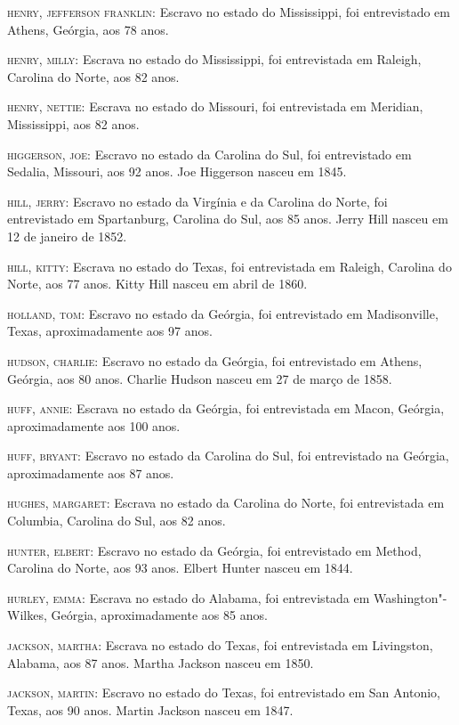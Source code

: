 \begin{Parskip}
\textsc{henry, jefferson franklin:} Escravo no estado do Mississippi,
foi entrevistado em Athens, Geórgia, aos 78 anos.

\textsc{henry, milly:} Escrava no estado do Mississippi, foi
entrevistada em Raleigh, Carolina do Norte, aos 82 anos.

\textsc{henry, nettie:} Escrava no estado do Missouri, foi entrevistada
em Meridian, Mississippi, aos 82 anos.

\textsc{higgerson, joe:} Escravo no estado da Carolina do Sul, foi
entrevistado em Sedalia, Missouri, aos 92 anos. Joe Higgerson nasceu em
1845.

\textsc{hill, jerry:} Escravo no estado da Virgínia e da Carolina do
Norte, foi entrevistado em Spartanburg, Carolina do Sul, aos 85 anos.
Jerry Hill nasceu em 12 de janeiro de 1852.

\textsc{hill, kitty:} Escrava no estado do Texas, foi entrevistada em
Raleigh, Carolina do Norte, aos 77 anos. Kitty Hill nasceu em abril de
1860.

\textsc{holland, tom:} Escravo no estado da Geórgia, foi entrevistado em
Madisonville, Texas, aproximadamente aos 97 anos.

\textsc{hudson, charlie:} Escravo no estado da Geórgia, foi entrevistado
em Athens, Geórgia, aos 80 anos. Charlie Hudson nasceu em 27 de março de
1858.

\textsc{huff, annie:} Escrava no estado da Geórgia, foi entrevistada em
Macon, Geórgia, aproximadamente aos 100 anos.

\textsc{huff, bryant:} Escravo no estado da Carolina do Sul, foi
entrevistado na Geórgia, aproximadamente aos 87 anos.

\textsc{hughes, margaret:} Escrava no estado da Carolina do Norte, foi
entrevistada em Columbia, Carolina do Sul, aos 82 anos.

\textsc{hunter, elbert:} Escravo no estado da Geórgia, foi entrevistado
em Method, Carolina do Norte, aos 93 anos. Elbert Hunter nasceu em 1844.

\textsc{hurley, emma:} Escrava no estado do Alabama, foi entrevistada em
Washington"-Wilkes, Geórgia, aproximadamente aos 85 anos.

\textsc{jackson, martha:} Escrava no estado do Texas, foi entrevistada
em Livingston, Alabama, aos 87 anos. Martha Jackson nasceu em 1850.

\textsc{jackson, martin:} Escravo no estado do Texas, foi entrevistado
em San Antonio, Texas, aos 90 anos. Martin Jackson nasceu em 1847.


\end{Parskip}
